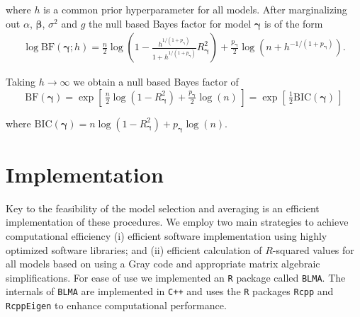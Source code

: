 \documentclass[12pt]{article}
\def\vectorfontone{\bf}
\def\vectorfonttwo{\boldsymbol}
\def\vy{{\vectorfontone y}}                      %
\def\vbeta{{\vectorfonttwo \beta}}               %
\def\vgamma{{\vectorfonttwo \gamma}}             %
\def\matrixfontone{\bf}
\def\mX{{\matrixfontone X}}                      %
\def\ds{\displaystyle}
\begin{document}
\noindent where $h$ is a common prior hyperparameter for all models. After marginalizing
out $\alpha$, $\vbeta$, $\sigma^2$ and $g$ the null based Bayes factor 
for model $\vgamma$ is of the form
$$
\begin{array}{rl}
\ds \log\mbox{BF}(\vgamma;h)
=
\tfrac{n}{2}\log\left( 1 - \tfrac{h^{1/(1+p_\vgamma)}}{1+h^{1/(1+p_\vgamma)}} R_\vgamma^2 \right) 
+ \tfrac{p_\vgamma}{2}\log\left(n + h^{-1/(1+p_\vgamma)} \right).
\end{array}
$$

\noindent Taking $h\to\infty$ we obtain a null based Bayes factor of
\begin{equation}\label{eq:marginalLikelihoodCake}
\ds \mbox{BF}(\vgamma)
=
\exp\left[ \,
\tfrac{n}{2}\log\left( 1 - R_\vgamma^2 \right) 
+ \tfrac{p_\vgamma}{2}\log\left(n \right) \,
\right] = \exp\left[ \, \tfrac{1}{2}\mbox{BIC}(\vgamma) \,\right]
\end{equation}

\noindent where $\mbox{BIC}(\vgamma) = n\log\left( 1 - R_\vgamma^2 \right) + p_\vgamma \log(n)$. 


 
\section{Implementation}
\label{sec:implementation}

Key to the feasibility of the model selection and averaging is an efficient implementation of these procedures. We employ two main 
strategies to achieve computational efficiency (i) efficient software implementation using
highly optimized software libraries; and (ii) efficient calculation of
$R$-squared values for all models based on using a Gray code and appropriate
matrix algebraic simplifications.
For ease of use we 
implemented an {\tt R} package called {\tt BLMA}.
The internals of {\tt BLMA} are implemented
in {\tt C++} and uses the {\tt R} packages \texttt{Rcpp} and \texttt{RcppEigen} to enhance
computational performance.  
\end{document}
